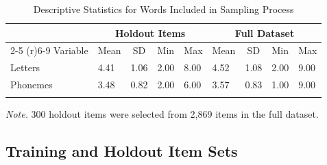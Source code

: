 \documentclass[
  ,man,floatsintext]{apa6}
\begin{document}
\begin{table}[tbp]

\begin{center}
\begin{threeparttable}

\caption{\label{tab:table1}Descriptive Statistics for Words Included in Sampling Process}

\begin{tabular}{lllllllll}
\toprule
 & \multicolumn{4}{c}{Holdout Items} & \multicolumn{4}{c}{Full Dataset} \\
\cmidrule(r){2-5} \cmidrule(r){6-9}
Variable & \multicolumn{1}{c}{Mean} & \multicolumn{1}{c}{SD} & \multicolumn{1}{c}{Min} & \multicolumn{1}{c}{Max} & \multicolumn{1}{c}{Mean} & \multicolumn{1}{c}{SD} & \multicolumn{1}{c}{Min} & \multicolumn{1}{c}{Max}\\
\midrule
Letters & 4.41 & 1.06 & 2.00 & 8.00 & 4.52 & 1.08 & 2.00 & 9.00\\
Phonemes & 3.48 & 0.82 & 2.00 & 6.00 & 3.57 & 0.83 & 1.00 & 9.00\\
\bottomrule
\addlinespace
\end{tabular}

\begin{tablenotes}[para]
\normalsize{\textit{Note.} 300 holdout items were selected from 2,869 items in the full dataset.}
\end{tablenotes}

\end{threeparttable}
\end{center}

\end{table}

\subsection{Training and Holdout Item Sets}\label{training-and-holdout-item-sets}
\end{document}
